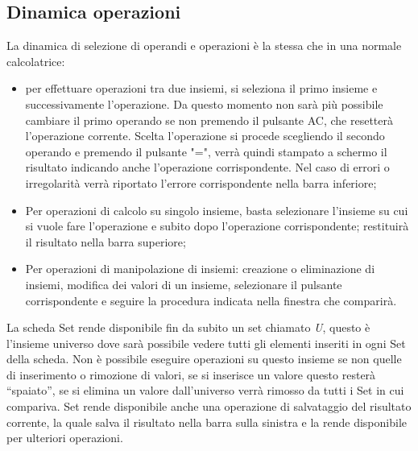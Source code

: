 \documentclass[a4paper,10pt]{article}
\begin{document}
            \subsection{Dinamica operazioni}
            La dinamica di selezione di operandi e operazioni è la stessa che in una normale calcolatrice: 
            \begin{itemize}
                \item per effettuare operazioni tra due insiemi, si seleziona il primo insieme e successivamente l’operazione. Da questo momento non sarà più possibile cambiare il primo operando se non premendo il pulsante AC, che resetterà l’operazione corrente. Scelta l’operazione si procede scegliendo il secondo operando e premendo il pulsante "=", verrà quindi stampato a schermo il risultato indicando anche l’operazione corrispondente. Nel caso di errori o irregolarità verrà riportato l’errore corrispondente nella barra inferiore;
                \item Per operazioni di calcolo su singolo insieme, basta selezionare l’insieme su cui si vuole fare l’operazione e subito dopo l’operazione corrispondente; restituirà il risultato nella barra superiore;
                \item Per operazioni di manipolazione di insiemi: creazione o eliminazione di insiemi, modifica dei valori di un insieme, selezionare il pulsante corrispondente e seguire la procedura indicata nella finestra che comparirà.
    
            \end{itemize}
    
            \noindent La scheda Set rende disponibile fin da subito un set chiamato \textit{U}, questo è l’insieme universo dove sarà possibile vedere tutti gli elementi inseriti in ogni Set della scheda. Non è possibile eseguire operazioni su questo insieme se non quelle di inserimento o rimozione di valori, se si inserisce un valore questo resterà “spaiato”, se si elimina un valore dall’universo verrà rimosso da tutti i Set in
            cui compariva.
            Set rende disponibile anche una operazione di salvataggio del risultato corrente, la quale salva il risultato
            nella barra sulla sinistra e la rende disponibile per ulteriori operazioni.
    
\end{document}
